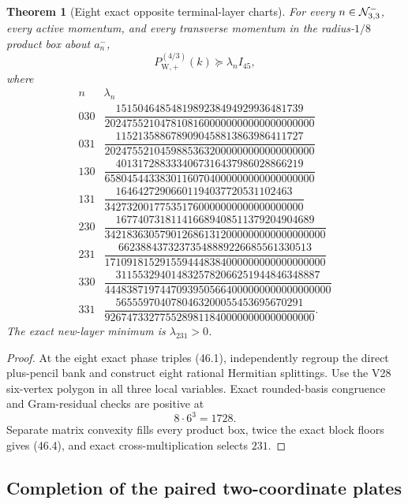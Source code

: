 \documentclass[11pt,oneside]{article}
\newtheorem{theorem}{Theorem}[section]
\theoremstyle{definition}
\theoremstyle{remark}
\begin{document}
\begin{theorem}[Eight exact opposite terminal-layer charts]
\label{thm:newv46-eight-charts}
For every \(n\in{\cal N}_{3,3}^{-}\), every active momentum, and
every transverse momentum in the radius-\(1/8\) product box about
\(a_n^-\),
\[
 P_{\mathrm W,+}^{(4/3)}(k)\succeq\lambda_n I_{45},    \tag{46.3}
\]
where
\[
\begin{array}{c|c}
n&\lambda_n\\ \hline
030&\dfrac{1515046485481989238494929936481739}
{20247552104781081600000000000000000000}\\[5pt]
031&\dfrac{1152135886789090458813863986411727}
{20247552104598853632000000000000000000}\\[5pt]
130&\dfrac{4013172883334067316437986028866219}
{65804544338301160704000000000000000000}\\[5pt]
131&\dfrac{16464272906601194037720531102463}
{342732001775351760000000000000000000}\\[5pt]
230&\dfrac{167740731811416689408511379204904689}
{3421836305790126861312000000000000000000}\\[5pt]
231&\dfrac{66238843732373548889226685561330513}
{1710918152915594448384000000000000000000}\\[5pt]
330&\dfrac{3115532940148325782066251944846348887}
{44483871974470939505664000000000000000000}\\[5pt]
331&\dfrac{5655597040780463200055453695670291}
{92674733277552898118400000000000000000}.
\end{array}                                             \tag{46.4}
\]
The exact new-layer minimum is \(\lambda_{231}>0\).
\end{theorem}

\begin{proof}
At the eight exact phase triples (46.1), independently regroup the
direct plus-pencil bank and construct eight rational Hermitian
splittings.  Use the V28 six-vertex polygon in all three local
variables.  Exact rounded-basis congruence and Gram-residual checks
are positive at
\[
 8\cdot6^3=1728.                                       \tag{46.5}
\]
Separate matrix convexity fills every product box, twice the exact
block floors gives (46.4), and exact cross-multiplication selects
\(231\).
\end{proof}

\subsection{Completion of the paired two-coordinate plates}
\end{document}
